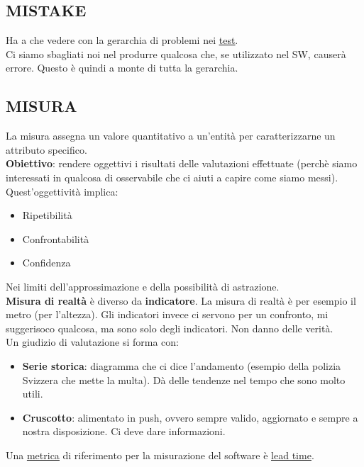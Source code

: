 		\subsection{MISTAKE}		\label{mistake}
		Ha a che vedere con la gerarchia di problemi nei \underline{\hyperref[test]{test}}. \\
		Ci siamo sbagliati noi nel produrre qualcosa che, se utilizzato  nel SW, causerà errore. Questo è quindi a monte di tutta la gerarchia.

		\subsection{MISURA}	 \label{misura}
		La misura assegna un valore quantitativo a un'entità per caratterizzarne un attributo specifico. \\
		\textbf{Obiettivo}: rendere oggettivi i risultati delle valutazioni effettuate (perchè siamo interessati in qualcosa di osservabile che ci aiuti a capire come siamo messi).
		Quest'oggettività implica:
		\begin{itemize}
			\item Ripetibilità
			\item Confrontabilità
			\item Confidenza
		\end{itemize}
		Nei limiti dell'approssimazione e della possibilità di astrazione. \\
		\textbf{Misura di realtà} è diverso da \textbf{indicatore}.
		La misura di realtà è per esempio il metro (per l'altezza).
		Gli indicatori invece ci servono per un confronto, mi suggerisoco qualcosa, ma sono solo degli indicatori. Non danno delle verità. \\
		Un giudizio di valutazione si forma con: %
		\begin{itemize}
			\item \textbf{Serie storica}: diagramma che ci dice l'andamento (esempio della polizia Svizzera che mette la multa). Dà delle tendenze nel tempo che sono molto utili.
			\item \textbf{Cruscotto}: alimentato in push, ovvero sempre valido, aggiornato e sempre a nostra disposizione. Ci deve dare informazioni.
		\end{itemize}
		Una \underline{\hyperref[metrica]{metrica}} di riferimento per la misurazione del software è \underline{\hyperref[leadtime]{lead time}}.




